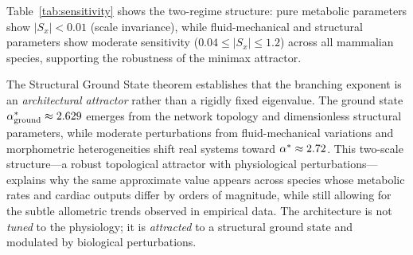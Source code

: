 \begin{remark}
Table~\ref{tab:sensitivity} shows the two-regime structure: pure metabolic
parameters show $|S_x| < 0.01$ (scale invariance), while fluid-mechanical and
structural parameters show moderate sensitivity ($0.04 \leq |S_x| \leq 1.2$)
across all mammalian species, supporting the robustness of the minimax
attractor.
\end{remark}

\begin{remark}
The Structural Ground State theorem establishes that the branching exponent is
an \emph{architectural attractor} rather than a rigidly fixed eigenvalue. The
ground state $\alpha^*_{\mathrm{ground}} \approx 2.629$ emerges
from the network topology and dimensionless structural parameters, while
moderate perturbations from fluid-mechanical variations and morphometric
heterogeneities shift real systems toward $\alpha^* \approx 2.72$. This
two-scale structure---a robust topological attractor with physiological
perturbations---explains why the same approximate value appears across species
whose metabolic rates and cardiac outputs differ by orders of magnitude, while
still allowing for the subtle allometric trends observed in empirical data. The
architecture is not \emph{tuned} to the physiology; it is \emph{attracted} to a
structural ground state and modulated by biological perturbations.
\end{remark}
